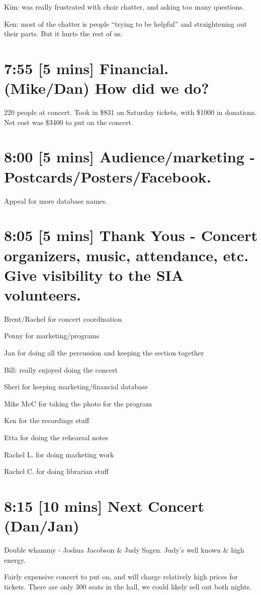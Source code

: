 \documentclass[11pt]{article}
\begin{document}
Kim: was really frustrated with choir chatter, and asking too many questions.

Ken: most of the chatter is people ``trying to be helpful'' and
straightening out their parts.  But it hurts the rest of us.
\section{7:55 [5 mins] Financial. (Mike/Dan) How did we do?}
\label{sec-5}


220 people at concert.  Took in \$831 on Saturday tickets, with \$1000
in donations.  Net cost was \$3400 to put on the concert.
\section{8:00 [5 mins] Audience/marketing - Postcards/Posters/Facebook.}
\label{sec-6}

   Appeal for more database names.
\section{8:05 [5 mins] Thank Yous - Concert organizers, music, attendance, etc.  Give visibility to the SIA volunteers.}
\label{sec-7}


Brent/Rachel for concert coordination

Penny for marketing/programs

Jan for doing all the percussion and keeping the section together

Bill: really enjoyed doing the concert

Sheri for keeping marketing/financial database

Mike McC for taking the photo for the program

Ken for the recordings stuff

Etta for doing the rehearsal notes

Rachel L. for doing marketing work

Rachel C. for doing librarian stuff
\section{8:15 [10 mins] Next Concert (Dan/Jan)}
\label{sec-8}


Double whammy - Joshua Jacobson \& Judy Sagen.  Judy's well known \&
high energy.

Fairly expensive concert to put on, and will charge relatively high
prices for tickets.  There are only 300 seats in the hall, we could
likely sell out both nights.
\end{document}
